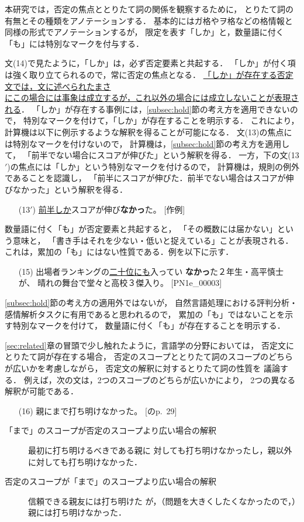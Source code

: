 \documentclass[japanese]{jnlp_1.4}
\begin{document}
本研究では，否定の焦点ととりたて詞の関係を観察するために，
とりたて詞の有無とその種類をアノテーションする．
基本的にはガ格やヲ格などの格情報と同様の形式でアノテーションするが，
限定を表す「しか」と，数量語に付く「も」には特別なマークを付与する．

文(14)で見たように，「しか」は，必ず否定要素と共起する．
「しか」が付く項は強く取り立てられるので，常に否定の焦点となる．
\underline{「しか」が存在する否定文では，文に述べられたまさ}\\
\underline{にこの場合には事象は成立するが，これ以外の場合には成立しないことが表現される}．
「しか」が存在する事例には，\ref{subsec:hold}節の考え方を適用できないので，
特別なマークを付けて，「しか」が存在することを明示する．
これにより，計算機は以下に例示するような解釈を得ることが可能になる．
文(13)の焦点には特別なマークを付けないので，
計算機は，\ref{subsec:hold}節の考え方を適用して，
「前半でない場合にスコアが伸びた」という解釈を得る．
一方，下の文(13$'$)の焦点には「しか」という特別なマークを付けるので，
計算機は，規則の例外であることを認識し，
「前半にスコアが伸びた．前半でない場合はスコアが伸びなかった」という解釈を得る．
\begin{enumerate}
\item[(13$'$)] \underline{前半しか}スコアが伸び\textbf{なかっ}た。 
  [作例]
\end{enumerate}

数量語に付く「も」が否定要素と共起すると，
「その概数には届かない」という意味と，
「書き手はそれを少ない・低いと捉えている」ことが表現される\cite{toritate2009}．
これは，累加の「も」にはない性質である．例を以下に示す．
\begin{enumerate}
\item[(15)] 出場者ランキングの\underline{二十位にも}入ってい
  \textbf{なかっ}た２年生・高平慎士が、
  晴れの舞台で堂々と高校３傑入り。 [PN1e\_00003]
\end{enumerate}
\ref{subsec:hold}節の考え方の適用外ではないが，
自然言語処理における評判分析・感情解析タスクに有用であると思われるので，
累加の「も」ではないことを示す特別なマークを付けて，
数量語に付く「も」が存在することを明示する．

\ref{sec:related}章の冒頭で少し触れたように，言語学の分野においては，
否定文にとりたて詞が存在する場合，
否定のスコープととりたて詞のスコープのどちらが広いかを考慮しながら，
否定文の解釈に対するとりたて詞の性質を
議論する\cite{Numata1986,Mogi1999,Numata2009,Kobayashi2009}．
例えば，次の文は，2つのスコープのどちらが広いかにより，
2つの異なる解釈が可能である\cite{Mogi1999}．
\begin{enumerate}
\item[(16)] 親にまで打ち明けなかった。 [\cite{Mogi1999}のp.~29]
\end{enumerate}
\begin{description}
\item[「まで」のスコープが否定のスコープより広い場合の解釈]
  最初に打ち明けるべきである親に
  対しても打ち明けなかったし，親以外に対しても打ち明けなかった．
\item[否定のスコープが「まで」のスコープより広い場合の解釈]
  信頼できる親友には打ち明けた
  が，（問題を大きくしたくなかったので，）親には打ち明けなかった．
\end{description}
\end{document}
